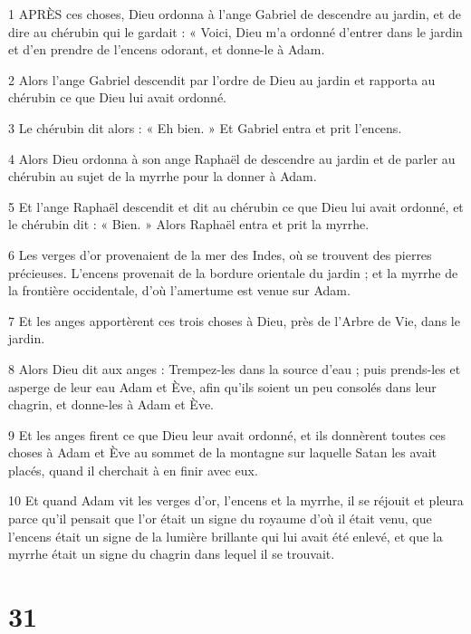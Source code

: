\par 1 APRÈS ces choses, Dieu ordonna à l'ange Gabriel de descendre au jardin, et de dire au chérubin qui le gardait : « Voici, Dieu m'a ordonné d'entrer dans le jardin et d'en prendre de l'encens odorant, et donne-le à Adam.

\par 2 Alors l'ange Gabriel descendit par l'ordre de Dieu au jardin et rapporta au chérubin ce que Dieu lui avait ordonné.

\par 3 Le chérubin dit alors : « Eh bien. » Et Gabriel entra et prit l'encens.

\par 4 Alors Dieu ordonna à son ange Raphaël de descendre au jardin et de parler au chérubin au sujet de la myrrhe pour la donner à Adam.

\par 5 Et l'ange Raphaël descendit et dit au chérubin ce que Dieu lui avait ordonné, et le chérubin dit : « Bien. » Alors Raphaël entra et prit la myrrhe.

\par 6 Les verges d'or provenaient de la mer des Indes, où se trouvent des pierres précieuses. L'encens provenait de la bordure orientale du jardin ; et la myrrhe de la frontière occidentale, d'où l'amertume est venue sur Adam.

\par 7 Et les anges apportèrent ces trois choses à Dieu, près de l'Arbre de Vie, dans le jardin.

\par 8 Alors Dieu dit aux anges : Trempez-les dans la source d'eau ; puis prends-les et asperge de leur eau Adam et Ève, afin qu'ils soient un peu consolés dans leur chagrin, et donne-les à Adam et Ève.

\par 9 Et les anges firent ce que Dieu leur avait ordonné, et ils donnèrent toutes ces choses à Adam et Ève au sommet de la montagne sur laquelle Satan les avait placés, quand il cherchait à en finir avec eux.

\par 10 Et quand Adam vit les verges d'or, l'encens et la myrrhe, il se réjouit et pleura parce qu'il pensait que l'or était un signe du royaume d'où il était venu, que l'encens était un signe de la lumière brillante qui lui avait été enlevé, et que la myrrhe était un signe du chagrin dans lequel il se trouvait.

\chapter{31}

